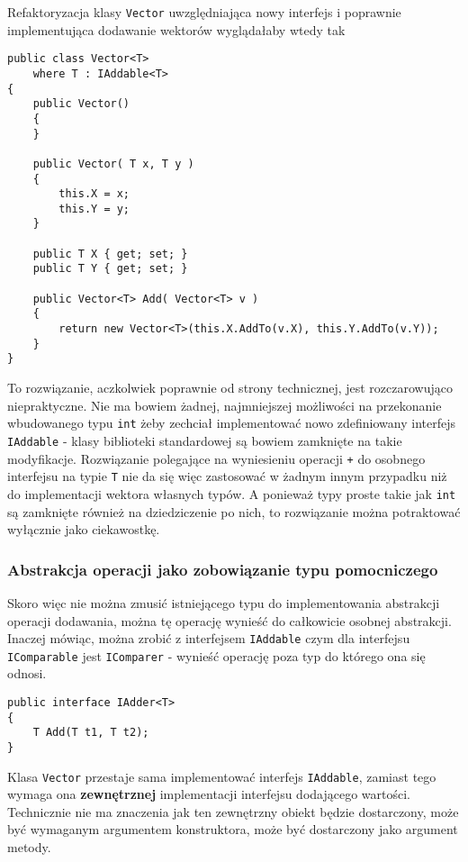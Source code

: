 Refaktoryzacja klasy {\tt Vector} uwzględniająca nowy interfejs i poprawnie implementująca dodawanie wektorów
wyglądałaby wtedy tak

\begin{scriptsize}
\begin{verbatim}
public class Vector<T>
    where T : IAddable<T>
{
    public Vector()
    {
    }

    public Vector( T x, T y )
    {
        this.X = x;
        this.Y = y;
    }

    public T X { get; set; }
    public T Y { get; set; }

    public Vector<T> Add( Vector<T> v )
    {
        return new Vector<T>(this.X.AddTo(v.X), this.Y.AddTo(v.Y));
    }
}
\end{verbatim}
\end{scriptsize}

To rozwiązanie, aczkolwiek poprawnie od strony technicznej, jest rozczarowująco niepraktyczne. Nie ma bowiem
żadnej, najmniejszej możliwości na przekonanie wbudowanego typu {\tt int} żeby zechciał implementować
nowo zdefiniowany interfejs {\tt IAddable} - klasy biblioteki standardowej są bowiem zamknięte na takie modyfikacje.
Rozwiązanie polegające na wyniesieniu operacji {\tt +} do osobnego interfejsu na typie {\tt T} nie da się więc
zastosować w żadnym innym przypadku niż do implementacji wektora własnych typów. A ponieważ typy proste takie jak
{\tt int} są zamknięte również na dziedziczenie po nich, to rozwiązanie można potraktować wyłącznie jako ciekawostkę.

\subsubsection{Abstrakcja operacji jako zobowiązanie typu pomocniczego}

Skoro więc nie można zmusić istniejącego typu do implementowania abstrakcji operacji dodawania, można tę operację
wynieść do całkowicie osobnej abstrakcji. Inaczej mówiąc, można zrobić z interfejsem {\tt IAddable} czym dla interfejsu
{\tt IComparable} jest {\tt IComparer} - wynieść operację poza typ do którego ona się odnosi.

\begin{scriptsize}
\begin{verbatim}
public interface IAdder<T>
{
    T Add(T t1, T t2);
}
\end{verbatim}
\end{scriptsize}

Klasa {\tt Vector} przestaje sama implementować interfejs {\tt IAddable}, zamiast tego wymaga ona {\bf zewnętrznej}
implementacji interfejsu dodającego wartości. Technicznie nie ma znaczenia jak ten zewnętrzny obiekt będzie
dostarczony, może być wymaganym argumentem konstruktora, może być dostarczony jako argument metody. 

